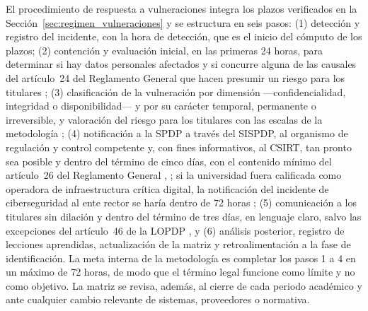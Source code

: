 El procedimiento de respuesta a vulneraciones integra los plazos verificados en la Sección~\ref{sec:regimen_vulneraciones} y se estructura en seis pasos: (1) detección y registro del incidente, con la hora de detección, que es el inicio del cómputo de los plazos; (2) contención y evaluación inicial, en las primeras 24 horas, para determinar si hay datos personales afectados y si concurre alguna de las causales del artículo~24 del Reglamento General que hacen presumir un riesgo para los titulares \cite[art.~24]{rlopdp2023}; (3) clasificación de la vulneración por dimensión ---confidencialidad, integridad o disponibilidad--- y por su carácter temporal, permanente o irreversible, y valoración del riesgo para los titulares con las escalas de la metodología \cite{spdp2026vulneraciones}; (4) notificación a la SPDP a través del SISPDP, al organismo de regulación y control competente y, con fines informativos, al CSIRT, tan pronto sea posible y dentro del término de cinco días, con el contenido mínimo del artículo~26 del Reglamento General \cite[art.~43]{lopdp2021}, \cite[art.~26]{rlopdp2023}; si la universidad fuera calificada como operadora de infraestructura crítica digital, la notificación del incidente de ciberseguridad al ente rector se haría dentro de 72 horas \cite{lofc2026}; (5) comunicación a los titulares sin dilación y dentro del término de tres días, en lenguaje claro, salvo las excepciones del artículo~46 de la LOPDP \cite[art.~46]{lopdp2021}, y (6) análisis posterior, registro de lecciones aprendidas, actualización de la matriz y retroalimentación a la fase de identificación. La meta interna de la metodología es completar los pasos 1 a 4 en un máximo de 72 horas, de modo que el término legal funcione como límite y no como objetivo. La matriz se revisa, además, al cierre de cada periodo académico y ante cualquier cambio relevante de sistemas, proveedores o normativa.

